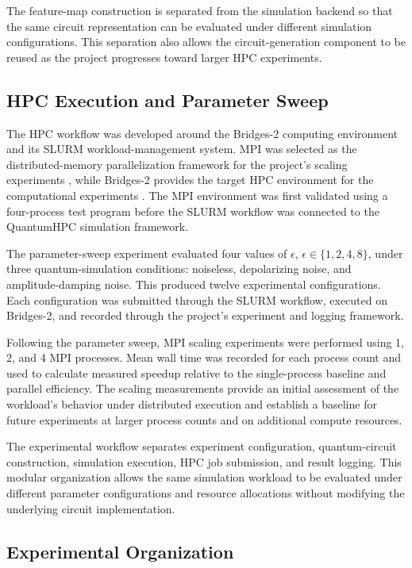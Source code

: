 \documentclass[pdflatex,sn-mathphys-num]{sn-jnl}%
\theoremstyle{thmstyleone}%
\theoremstyle{thmstyletwo}%
\theoremstyle{thmstylethree}%
\begin{document}
The feature-map construction is separated from the simulation backend so that the same circuit representation can be evaluated under different simulation configurations. This separation also allows the circuit-generation component to be reused as the project progresses toward larger HPC experiments.

\subsection{HPC Execution and Parameter Sweep}\label{subsec:hpc-method}

The HPC workflow was developed around the Bridges-2 computing environment and its SLURM workload-management system. MPI was selected as the distributed-memory parallelization framework for the project's scaling experiments \cite{mpiforum2023,llnlmpi}, while Bridges-2 provides the target HPC environment for the computational experiments \cite{bridges2}. The MPI environment was first validated using a four-process test program before the SLURM workflow was connected to the QuantumHPC simulation framework.

The parameter-sweep experiment evaluated four values of $\epsilon$, $\epsilon \in \{1,2,4,8\}$, under three quantum-simulation conditions: noiseless, depolarizing noise, and amplitude-damping noise. This produced twelve experimental configurations. Each configuration was submitted through the SLURM workflow, executed on Bridges-2, and recorded through the project's experiment and logging framework.

Following the parameter sweep, MPI scaling experiments were performed using 1, 2, and 4 MPI processes. Mean wall time was recorded for each process count and used to calculate measured speedup relative to the single-process baseline and parallel efficiency. The scaling measurements provide an initial assessment of the workload's behavior under distributed execution and establish a baseline for future experiments at larger process counts and on additional compute resources.

The experimental workflow separates experiment configuration, quantum-circuit construction, simulation execution, HPC job submission, and result logging. This modular organization allows the same simulation workload to be evaluated under different parameter configurations and resource allocations without modifying the underlying circuit implementation.

\subsection{Experimental Organization}\label{subsec:experimental-organization}
\end{document}
